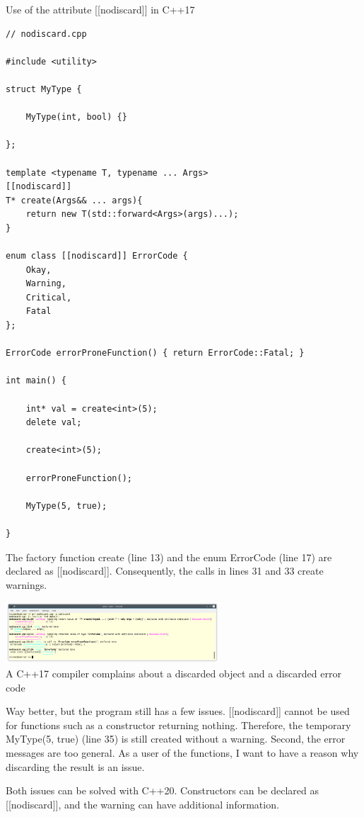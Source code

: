 \noindent
Use of the attribute [[nodiscard]] in C++17
\begin{lstlisting}[style=styleCXX]
// nodiscard.cpp

#include <utility>

struct MyType {

	MyType(int, bool) {}

};

template <typename T, typename ... Args>
[[nodiscard]]
T* create(Args&& ... args){
	return new T(std::forward<Args>(args)...);
}

enum class [[nodiscard]] ErrorCode {
	Okay,
	Warning,
	Critical,
	Fatal
};

ErrorCode errorProneFunction() { return ErrorCode::Fatal; }

int main() {

	int* val = create<int>(5);
	delete val;
	
	create<int>(5);
	
	errorProneFunction();
	
	MyType(5, true);

}
\end{lstlisting}

The factory function create (line 13) and the enum ErrorCode (line 17) are declared as [[nodiscard]]. 
Consequently, the calls in lines 31 and 33 create warnings.

\begin{center}
\includegraphics[width=0.6\textwidth]{content/3/chapter4/images/45.png}\\
A C++17 compiler complains about a discarded object and a discarded error code
\end{center}

Way better, but the program still has a few issues. [[nodiscard]] cannot be used for functions such as a constructor returning nothing. Therefore, the temporary MyType(5, true) (line 35) is still created without a warning. Second, the error messages are too general. As a user of the functions, I want to have a reason why discarding the result is an issue.

Both issues can be solved with C++20. Constructors can be declared as [[nodiscard]], and the warning can have additional information.


